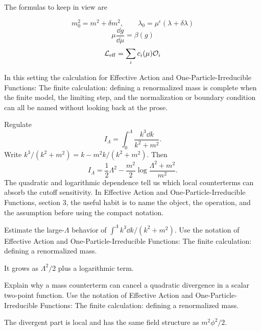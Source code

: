 The formulas to keep in view are

\[
  m_0^2=m^2+\delta m^2,\qquad \lambda_0=\mu^\epsilon(\lambda+\delta\lambda)
\]
\[
  \mu\frac{\dd g}{\dd\mu}=\beta(g)
\]
\[
  \mathcal L_{\mathrm{eff}}=\sum_i c_i(\mu)\mathcal O_i
\]

In this setting the calculation for Effective Action and One-Particle-Irreducible Functions: The finite calculation: defining a renormalized mass is complete when the finite model, the limiting step, and the normalization or boundary condition can all be named without looking back at the prose.




\begin{example}
Regulate
\[
  I_\Lambda=\int_0^\Lambda\frac{k^3\dd k}{k^2+m^2}.
\]
Write \(k^3/(k^2+m^2)=k-m^2k/(k^2+m^2)\).  Then
\[
  I_\Lambda=\frac12\Lambda^2-\frac{m^2}{2}\log\frac{\Lambda^2+m^2}{m^2}.
\]
The quadratic and logarithmic dependence tell us which local counterterms can absorb the cutoff sensitivity.  In Effective Action and One-Particle-Irreducible Functions, section 3, the useful habit is to name the object, the operation, and the assumption before using the compact notation.
\end{example}



\begin{exercise}
Estimate the large-\(\Lambda\) behavior of \(\int^\Lambda k^3\dd k/(k^2+m^2)\).  Use the notation of Effective Action and One-Particle-Irreducible Functions: The finite calculation: defining a renormalized mass.
\begin{answer}
It grows as \(\Lambda^2/2\) plus a logarithmic term.
\end{answer}
\end{exercise}

\begin{exercise}
Explain why a mass counterterm can cancel a quadratic divergence in a scalar two-point function.  Use the notation of Effective Action and One-Particle-Irreducible Functions: The finite calculation: defining a renormalized mass.
\begin{answer}
The divergent part is local and has the same field structure as \(m^2\phi^2/2\).
\end{answer}
\end{exercise}



